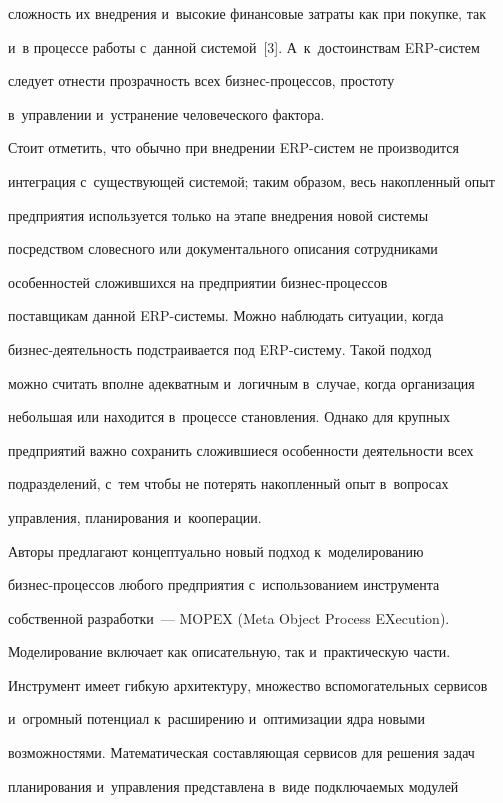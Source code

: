 сложность их внедрения и~высокие финансовые затраты как при покупке, так 

и~в процессе работы с~данной системой~[3]. А~к~достоинствам ERP-сис\-тем 

следует отнести прозрачность всех биз\-нес-про\-цес\-сов, простоту 

в~управлении и~устранение человеческого фактора. 

  

  Стоит отметить, что обычно при внедрении ERP-сис\-тем не производится 

интеграция с~существующей системой; таким образом, весь накопленный опыт 

предприятия используется только на этапе внедрения новой системы 

посредством словесного или документального описания сотрудниками 

особенностей сложившихся на предприятии биз\-нес-про\-цес\-сов 

поставщикам данной ERP-сис\-те\-мы. Можно наблюдать ситуации, когда  

биз\-нес-де\-я\-тель\-ность подстраивается под ERP-сис\-те\-му. Такой подход 

можно считать вполне адекватным и~логичным в~случае, когда организация 

небольшая или находится в~процессе становления. Однако для крупных 

предприятий важно сохранить сложившиеся особенности деятельности всех 

подразделений, с~тем чтобы не потерять накопленный опыт в~вопросах 

управления, планирования и~кооперации. 

  

  Авторы предлагают концептуально новый подход к~моделированию  

биз\-нес-про\-цес\-сов любого предприятия с~использованием инструмента 

собственной разработки~--- MOPEX (Meta Object Process EXecution). 

Моделирование включает как описательную, так и~практическую части. 

Инструмент имеет гибкую архитектуру, множество вспомогательных сервисов 

и~огромный потенциал к~расширению и~оптимизации ядра новыми 

возможностями. Математическая составляющая сервисов для решения задач 

планирования и~управления пред\-став\-ле\-на в~виде подключаемых модулей 

